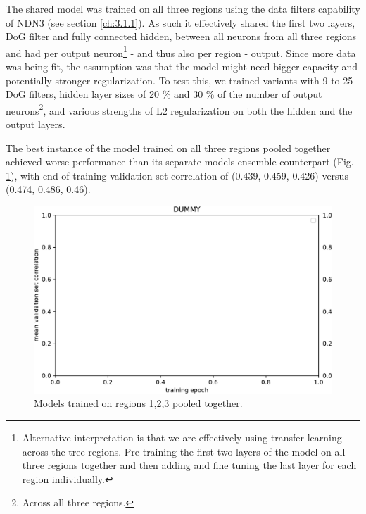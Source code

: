 The shared model was trained on all three regions using the data filters capability of NDN3 (see section \ref{ch:3.1.1}). As such it effectively shared the first two layers, DoG filter and fully connected hidden, between all neurons from all three regions and had per output neuron\footnote{Alternative interpretation is that we are effectively using transfer learning across the tree regions. Pre-training the first two layers of the model on all three regions together and then adding and fine tuning the last layer for each region individually.} - and thus also per region - output. Since more data was being fit, the assumption was that the model might need bigger capacity and potentially stronger regularization. To test this, we trained variants with 9 to 25 DoG filters, hidden layer sizes of 20 \% and 30 \% of the number of output neurons\footnote{Across all three regions.}, and various strengths of L2 regularization on both the hidden and the output layers. 

The best instance of the model trained on all three regions pooled together achieved worse performance than its separate-models-ensemble counterpart (Fig. \ref{fig:5.3.1.1_1}), with end of training validation set correlation of (0.439, 0.459, 0.426) versus (0.474, 0.486, 0.46). 

\begin{figure}[H]
    \centering
    \includegraphics[width=1\textwidth]{../figures/05_dummy}
    \caption[Experiment 3.1.1]{Models trained on regions 1,2,3 pooled together\protect\footnotemark.}
    \label{fig:5.3.1.1_1}
\end{figure}

